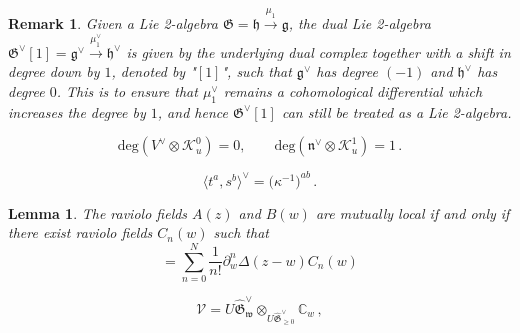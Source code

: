 \documentclass[10pt,a4paper]{amsart}
\newtheorem{remark}{Remark}
\newtheorem{lemma}{Lemma}
\newcommand{\CK}{{\mathcal K}}
\newcommand{\fG}{\mathfrak{G}}
\newcommand{\fg}{\mathfrak{g}}
\newcommand{\fh}{\mathfrak{h}}
\newcommand{\fn}{\mathfrak{n}}
\begin{document}
\begin{remark}\label{dualdegree}
    Given a Lie 2-algebra $\fG = \fh\xrightarrow{\mu_1}\fg$, the dual Lie 2-algebra $\fG^\vee[1] = \fg^\vee\xrightarrow{\mu_1^\vee}\fh^\vee$ is given by the underlying dual complex together with a shift in degree \textit{down} by $1$, denoted by "$[1]$", such that $\fg^\vee$ has degree $(-1)$ and $\fh^\vee$ has degree $0$. This is to ensure that $\mu_1^\vee$ remains a cohomological differential which increases the degree by $1$, and hence $\fG^\vee[1]$ can still be treated as a Lie 2-algebra.
\end{remark} 

\begin{equation}\label{degconvention}
     \text{deg}\left(V^\vee \otimes \CK_u^0\right) =0,\qquad \text{deg}\left(\fn^\vee \otimes \CK_u^1\right)=1\,.
\end{equation}

\begin{equation}
\label{ec:kilform}
    \langle t^a,s^b\rangle^\vee = \big(\kappa^{-1}\big)^{ab} \,.
\end{equation}

\begin{lemma}
\label{ec:equivmutualloc}
    The raviolo fields $A(z)$ and $B(w)$ are mutually local if and only if there exist raviolo fields $C_n(w)$ such that 
    \begin{equation}
        [A(z),B(w)]=\sum_{n=0}^N \frac{1}{n!}\partial_w^n\Delta(z-w)C_n(w)
    \end{equation}
\end{lemma}

\begin{equation}
\label{ec:vacummodule}
   \mathcal{V} = U\widehat{\mathfrak{G}}^\vee_{\mathfrak{w}} \otimes_{U\widehat{\mathfrak{G}}^\vee_{\geq 0}} \mathbb{C}_w\,, 
\end{equation}
\end{document}
